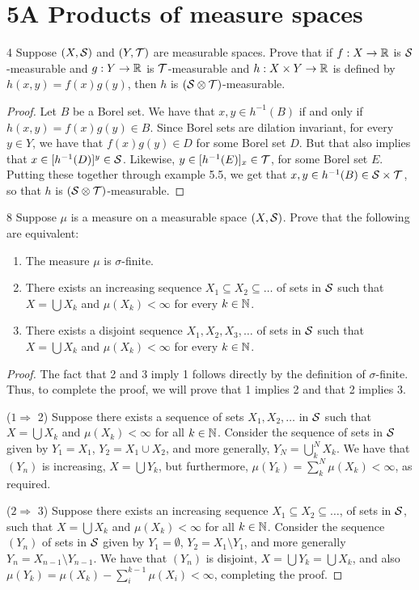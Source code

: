 \section{5A Products of measure spaces}


\begin{exercise}{4}
Suppose $(X, \mathcal{S})$ and $(Y, \mathcal{T})$ are measurable spaces.
Prove that if $f: X \to \mathbb{R}$ is $\mathcal{S}$-measurable and $g: Y \to \mathbb{R}$ is $\mathcal{T}$-measurable and $h: X \times Y \to \mathbb{R}$ is defined by $h(x, y) = f(x)g(y)$, then $h$ is $(\mathcal{S} \otimes \mathcal{T})$-measurable.
\end{exercise}
\begin{proof}
Let $B$ be a Borel set.
We have that $x, y \in h^{-1}(B)$ if and only if $h(x, y) = f(x) g(y) \in B$.
Since Borel sets are dilation invariant, for every $y \in Y$, we have that $f(x) g(y) \in D$ for some Borel set $D$.
But that also implies that $x \in [h^{-1}(D)]^y \in \mathcal{S}$.
Likewise, $y \in [h^{-1}(E)]_x \in \mathcal{T}$, for some Borel set $E$.
Putting these together through example 5.5, we get that $x, y \in h^{-1}(B) \in \mathcal{S} \times \mathcal{T}$, so that $h$ is $(\mathcal{S} \otimes \mathcal{T})$-measurable.
\end{proof} 

\begin{exercise}{8}
Suppose $\mu$ is a measure on a measurable space $(X, \mathcal{S})$.
Prove that the following are equivalent:
\begin{enumerate}
    \item The measure $\mu$ is $\sigma$-finite.
    \item There exists an increasing sequence $X_1 \subseteq X_2 \subseteq \dots$ of sets in $\mathcal{S}$ such that $X = \bigcup X_k$ and $\mu(X_k) < \infty$ for every $k \in \mathbb{N}$.
    \item There exists a disjoint sequence $X_1, X_2, X_3, \dots$ of sets in $\mathcal{S}$ such that $X = \bigcup X_k$ and $\mu(X_k) < \infty$ for every $k \in \mathbb{N}$.
\end{enumerate}
\end{exercise}
\begin{proof}
The fact that 2 and 3 imply 1 follows directly by the definition of $\sigma$-finite.
Thus, to complete the proof, we will prove that 1 implies 2 and that 2 implies 3.

($1 \Rightarrow$ 2)
Suppose there exists a sequence of sets $X_1, X_2, \dots$ in $\mathcal{S}$ such that $X = \bigcup X_k$ and $\mu(X_k) < \infty$ for all $k \in \mathbb{N}$.
Consider the sequence of sets in $\mathcal{S}$ given by $Y_1 = X_1$, $Y_2 = X_1 \cup X_2$, and more generally, $Y_N = \bigcup^N_k X_k$.
We have that $(Y_n)$ is increasing, $X = \bigcup Y_k$, but furthermore, $\mu(Y_k) = \sum_k^N \mu(X_k) < \infty$, as required.

($2 \Rightarrow$ 3)
Suppose there exists an increasing sequence $X_1 \subseteq X_2 \subseteq \dots$, of sets in $\mathcal{S}$, such that $X = \bigcup X_k$ and $\mu(X_k) < \infty$ for all $k \in \mathbb{N}$.
Consider the sequence $(Y_n)$ of sets in $\mathcal{S}$ given by $Y_1 = \emptyset$, $Y_2 = X_1 \setminus Y_1$, and more generally $Y_n = X_{n-1} \setminus Y_{n-1}$.
We have that $(Y_n)$ is disjoint, $X = \bigcup Y_k = \bigcup X_k$, and also $\mu(Y_k) = \mu(X_k) - \sum_i^{k-1} \mu(X_i) < \infty$, completing the proof.
\end{proof} 

